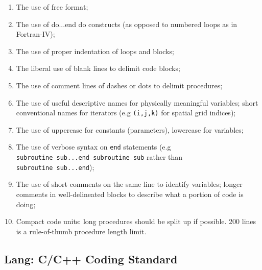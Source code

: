 \begin{enumerate}
\item The use of free format;
\item The use of do...end do constructs (as opposed to numbered loops
  as in Fortran-IV);
\item The use of proper indentation of loops and blocks;
\item The liberal use of blank lines to delimit code blocks;
\item The use of comment lines of dashes or dots to delimit
  procedures;
\item The use of useful descriptive names for physically meaningful
  variables; short conventional names for iterators (e.g
  \texttt{(i,j,k)} for spatial grid indices);
\item The use of uppercase for constants (parameters), lowercase for
  variables;
\item The use of verbose syntax on \texttt{end} statements (e.g
  \texttt{subroutine~sub...end~subroutine~sub} rather than
  \texttt{subroutine~sub...end});
\item The use of short comments on the same line to identify
  variables; longer comments in well-delineated blocks to describe
  what a portion of code is doing;
\item Compact code units: long procedures should be split up if
  possible. 200 lines is a rule-of-thumb procedure length limit.
\end{enumerate}

\subsection{Lang: C/C++ Coding Standard}

